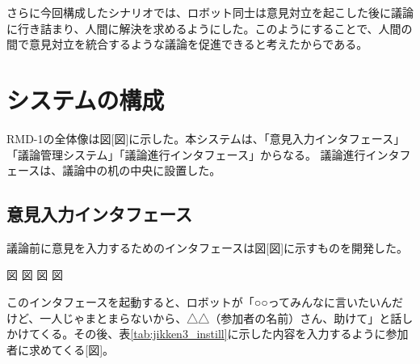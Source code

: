 \documentclass[11pt, a4paper]{jreport} %
\begin{document}
さらに今回構成したシナリオでは、ロボット同士は意見対立を起こした後に議論に行き詰まり、人間に解決を求めるようにした。このようにすることで、人間の間で意見対立を統合するような議論を促進できると考えたからである。





\section{システムの構成}
\label{sec:システム3}

RMD-1の全体像は図[図]に示した。本システムは、「意見入力インタフェース」「議論管理システム」「議論進行インタフェース」からなる。
議論進行インタフェースは、議論中の机の中央に設置した。


\subsection{意見入力インタフェース}
議論前に意見を入力するためのインタフェースは図[図]に示すものを開発した。

図
図
図
図


このインタフェースを起動すると、ロボットが「○○ってみんなに言いたいんだけど、一人じゃまとまらないから、△△（参加者の名前）さん、助けて」と話しかけてくる。その後、表\ref{tab:jikken3_instill}に示した内容を入力するように参加者に求めてくる[図]。
\end{document}
